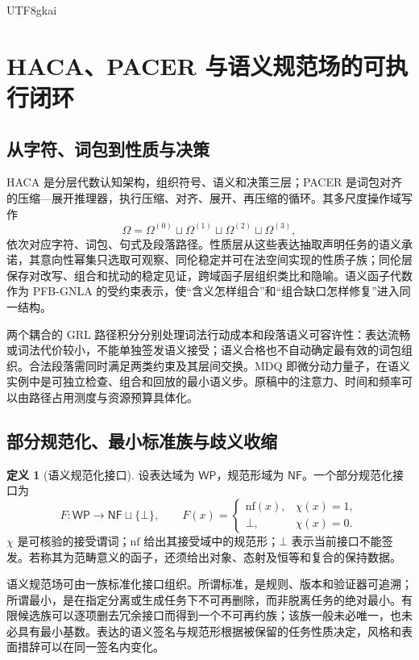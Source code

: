 \documentclass[11pt,a4paper]{article}
\theoremstyle{plain}
\theoremstyle{definition}
\newtheorem{definition}[theorem]{定义}
\theoremstyle{remark}
\begin{document}
\begin{CJK*}{UTF8}{gkai}
\section{HACA、PACER 与语义规范场的可执行闭环}
\label{fa:semantics}

\subsection{从字符、词包到性质与决策}

HACA 是分层代数认知架构，组织符号、语义和决策三层；PACER 是词包对齐的压缩—展开推理器，执行压缩、对齐、展开、再压缩的循环。其多尺度操作域写作
\[
 \Omega=\Omega^{(0)}\sqcup\Omega^{(1)}\sqcup
 \Omega^{(2)}\sqcup\Omega^{(3)},
\]
依次对应字符、词包、句式及段落路径。性质层从这些表达抽取声明任务的语义承诺，其意向性幂集只选取可观察、同伦稳定并可在法空间实现的性质子族；同伦层保存对改写、组合和扰动的稳定见证，跨域函子层组织类比和隐喻。语义函子代数作为 PFB-GNLA 的受约束表示，使“含义怎样组合”和“组合缺口怎样修复”进入同一结构。\cite{S04,S11}

两个耦合的 GRL 路径积分分别处理词法行动成本和段落语义可容许性：表达流畅或词法代价较小，不能单独签发语义接受；语义合格也不自动确定最有效的词包组织。合法段落需同时满足两类约束及其层间交换。MDQ 即微分动力量子，在语义实例中是可独立检查、组合和回放的最小语义步。原稿中的注意力、时间和频率可以由路径占用测度与资源预算具体化。

\subsection{部分规范化、最小标准族与歧义收缩}

\begin{definition}[语义规范化接口]
\label{fa:def-normalizer}
设表达域为 $\mathsf{WP}$，规范形域为 $\mathsf{NF}$。一个部分规范化接口为
\[
 F:\mathsf{WP}\to\mathsf{NF}\sqcup\{\bot\},\qquad
 F(x)=\begin{cases}\mathrm{nf}(x),&\chi(x)=1,\\\bot,&\chi(x)=0.\end{cases}
\]
$\chi$ 是可核验的接受谓词；$\mathrm{nf}$ 给出其接受域中的规范形；$\bot$ 表示当前接口不能签发。若称其为范畴意义的函子，还须给出对象、态射及恒等和复合的保持数据。
\end{definition}

语义规范场可由一族标准化接口组织。所谓标准，是规则、版本和验证器可追溯；所谓最小，是在指定分离或生成任务下不可再删除，而非脱离任务的绝对最小。有限候选族可以逐项删去冗余接口而得到一个不可再约族；该族一般未必唯一，也未必具有最小基数。表达的语义签名与规范形根据被保留的任务性质决定，风格和表面措辞可以在同一签名内变化。\cite{S11,S12}


\end{CJK*}
\end{document}
